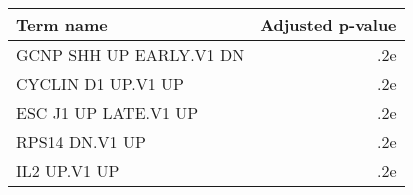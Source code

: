 \begin{tabular}{lr}
\toprule
              Term name &  Adjusted p-value \\
\midrule
GCNP SHH UP EARLY.V1 DN &               .2e \\
     CYCLIN D1 UP.V1 UP &               .2e \\
   ESC J1 UP LATE.V1 UP &               .2e \\
         RPS14 DN.V1 UP &               .2e \\
           IL2 UP.V1 UP &               .2e \\
\bottomrule
\end{tabular}
